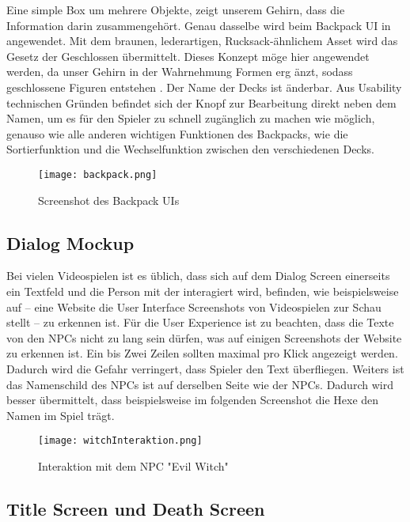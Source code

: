 Eine simple Box um mehrere Objekte, zeigt unserem Gehirn, dass die Information darin zusammengehört. Genau dasselbe
wird beim Backpack UI in \FF angewendet. Mit dem braunen, lederartigen, Rucksack-ähnlichem Asset wird das Gesetz der
Geschlossen übermittelt. Dieses Konzept möge hier angewendet werden, da unser Gehirn in der Wahrnehmung Formen erg
änzt, sodass geschlossene Figuren entstehen . Der Name der Decks ist änderbar. Aus Usability
technischen Gründen
befindet sich der Knopf zur Bearbeitung direkt neben dem Namen, um es für den Spieler zu schnell zugänglich zu machen wie möglich, genauso wie alle anderen wichtigen Funktionen des Backpacks, wie die Sortierfunktion und die Wechselfunktion zwischen den verschiedenen Decks.

\begin{figure}[H]
    \centering
    \texttt{[image: backpack.png]}
    \caption{Screenshot des Backpack UIs}
\end{figure}

\subsection{Dialog Mockup}

Bei vielen Videospielen ist es üblich, dass sich auf dem Dialog Screen einerseits ein Textfeld und die Person mit der interagiert wird, befinden, wie beispielsweise auf
 – eine Website die User Interface Screenshots von Videospielen zur Schau stellt – zu erkennen ist. Für die User Experience ist zu beachten, dass die Texte von den NPCs nicht zu lang sein dürfen, was auf einigen Screenshots der Website zu erkennen ist. Ein bis Zwei Zeilen sollten maximal pro Klick angezeigt werden. Dadurch wird die Gefahr verringert, dass Spieler den Text überfliegen. Weiters ist das Namenschild des NPCs ist auf derselben Seite wie der NPCs. Dadurch wird besser übermittelt, dass beispielsweise im folgenden Screenshot die Hexe den Namen
 im Spiel trägt.

\begin{figure}[H]
    \centering
    \texttt{[image: witchInteraktion.png]}
    \caption{Interaktion mit dem NPC "Evil Witch"}
\end{figure}

\subsection{Title Screen und Death Screen}

